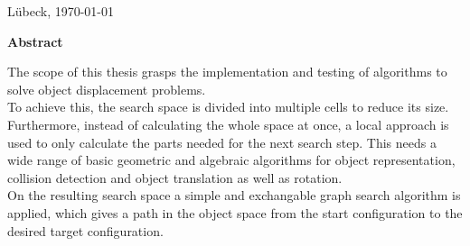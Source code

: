 \vspace*{3cm}
Lübeck, \today 
\newpage






\pagestyle{headings}


\centerline{\bf Abstract}



%
\vskip 2cm
%


The scope of this thesis grasps the implementation and testing of algorithms to solve object displacement problems.\\
To achieve this, the search space is divided into multiple cells to reduce its size. Furthermore, instead of calculating the whole space at once, a local approach is used to only calculate the parts needed for the next search step. This needs a wide range of basic geometric and algebraic algorithms for object representation, collision detection and object translation as well as rotation.\\
On the resulting search space a simple and exchangable graph search algorithm is applied, which gives a path in the object space from the
start configuration to the desired target configuration.

%
%
%
%
%

